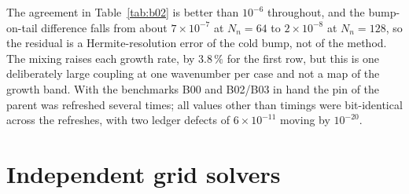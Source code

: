 \begin{table}[t]
\caption{B02/B03: fitted growth rate and the kinetic root, ordinary and dark ($\eta=0.3$, $\OmD=\wpe$). The two-stream rows are unchanged between $N_n=32$ and $64$; the bump-on-tail rows are $N_n=128$.}\label{tab:b02}
\small
{}
\end{table}

The agreement in Table~\ref{tab:b02} is better than $10^{-6}$ throughout, and the bump-on-tail difference falls from about $7\times10^{-7}$ at $N_n=64$ to $2\times10^{-8}$ at $N_n=128$, so the residual is a Hermite-resolution error of the cold bump, not of the method. The mixing raises each growth rate, by $3.8\,\%$ for the first row, but this is one deliberately large coupling at one wavenumber per case and not a map of the growth band. With the benchmarks B00 and B02/B03 in hand the pin of the parent was refreshed several times; all values other than timings were bit-identical across the refreshes, with two ledger defects of $6\times10^{-11}$ moving by $10^{-20}$.

\section{Independent grid solvers}\label{sec:grid}

